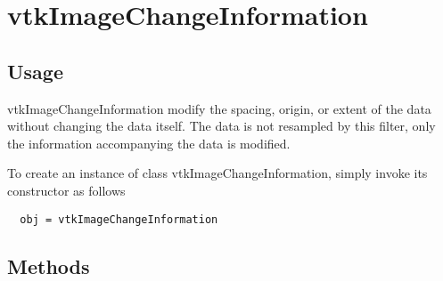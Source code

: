 \section{vtkImageChangeInformation}

\subsection{Usage}

 vtkImageChangeInformation  modify the spacing, origin, or extent of
 the data without changing the data itself.  The data is not resampled
 by this filter, only the information accompanying the data is modified.

To create an instance of class vtkImageChangeInformation, simply
invoke its constructor as follows
\begin{verbatim}
  obj = vtkImageChangeInformation
\end{verbatim}
\subsection{Methods}


